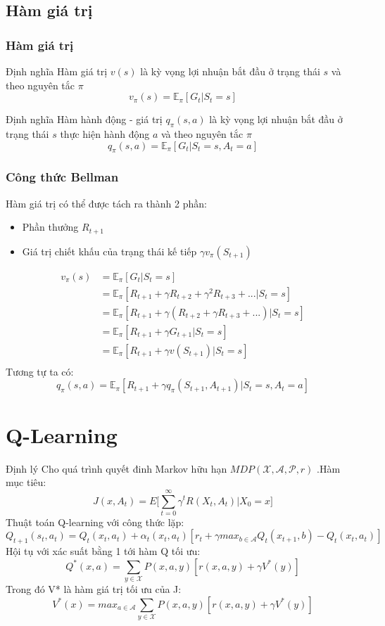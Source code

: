 \documentclass{beamer}
\begin{document}
\subsection{Hàm giá trị}

\begin{frame}
\frametitle{Hàm giá trị}
\begin{block}{Định nghĩa}
Hàm giá trị $v(s)$ là kỳ vọng lợi nhuận bắt đầu ở trạng thái $s$ và theo nguyên tắc $\pi$
$$v_\pi (s)=\mathbb{E}_\pi [G_t|S_t=s]$$
\end{block}

\begin{block}{Định nghĩa}
Hàm hành động - giá trị $q_\pi (s,a)$ là kỳ vọng lợi nhuận bắt đầu ở trạng thái $s$ thực hiện hành động $a$ và theo nguyên tắc $\pi$
$$q_\pi (s,a)=\mathbb{E}_\pi [G_t|S_t=s,A_t=a]$$
\end{block}
\end{frame}

\begin{frame}
\frametitle{Công thức Bellman}
Hàm giá trị có thể được tách ra thành 2 phần:
\begin{itemize}
\item Phần thưởng $R_{t+1}$
\item Giá trị chiết khấu của trạng thái kế tiếp $\gamma v_\pi (S_{t+1})$
\end{itemize}
\begin{equation}
\begin{split}
v_\pi (s) & = \mathbb{E}_\pi [G_t|S_t = s] \\
& = \mathbb{E}_\pi [R_{t+1} + \gamma R_{t+2} + \gamma^2 R_{t+3} + ... | S_t = s] \\
& = \mathbb{E}_\pi [R_{t+1} + \gamma (R_{t+2} + \gamma R_{t+3} + ...) | S_t = s] \\
& = \mathbb{E}_\pi [R_{t+1} + \gamma G_{t+1} | S_t = s] \\
& = \mathbb{E}_\pi [R_{t+1} + \gamma v(S_{t+1}) | S_t = s] \\
\end{split}
\end{equation}
Tương tự ta có:
$$q_\pi (s,a) = \mathbb{E}_\pi [R_{t+1} + \gamma q_\pi (S_{t+1},A_{t+1}) | S_t = s, A_t =a]$$
\end{frame}

\section{Q-Learning}
\begin{frame}
\begin{block}{Định lý}
Cho quá trình quyết đinh Markov hữu hạn $MDP(\mathcal{X},\mathcal{A},\mathcal{P},r)$
.Hàm mục tiêu:
$$J(x,{A_t})=E\big[ \sum_{t=0}^\infty{\gamma^t R(X_t,A_t)|X_0=x} \big]$$
Thuật toán Q-learning với công thức lặp:
$$Q_{t+1}(s_t,a_t)=Q_t(x_t,a_t)+\alpha_t(x_t,a_t)[r_t +\gamma max_{b \in \mathcal{A}}Q_t(x_{t+1},b)-Q_t(x_t,a_t)]$$
Hội tụ với xác suất bằng 1 tới hàm Q tối ưu:
$$Q^*(x,a)=\sum_{y\in\mathcal{X}}{P(x,a,y)[r(x,a,y)+\gamma V^*(y)]}$$
Trong đó V* là hàm giá trị tối ưu của J:
$$V^*(x)=max_{a\in\mathcal{A}}\sum_{y\in\mathcal{X}}{P(x,a,y)[r(x,a,y)+\gamma V^*(y)]}$$
\end{block}
\end{frame}
\end{document}
